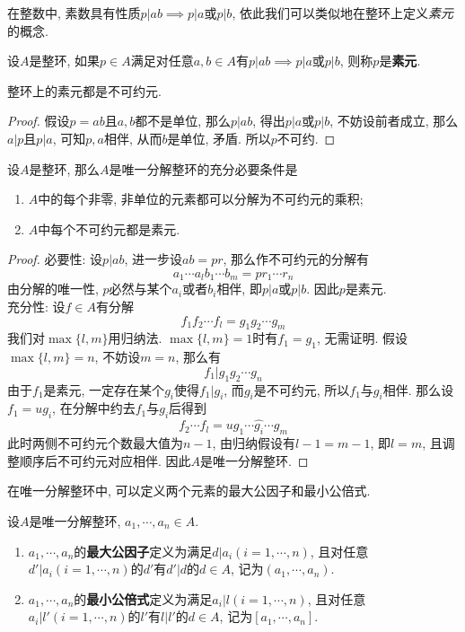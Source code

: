 在整数中, 素数具有性质$p|ab\implies p|a$或$p|b$, 依此我们可以类似地在整环上定义\textit{素元}的概念.

\begin{defn}
    设$A$是整环, 如果$p\in A$满足对任意$a,b\in A$有$p|ab\implies p|a$或$p|b$, 则称$p$是\textbf{素元}.
\end{defn}

\begin{lem}\label{prime implies irreducible}
    整环上的素元都是不可约元.
\end{lem}
\begin{proof}
    假设$p=ab$且$a,b$都不是单位, 那么$p|ab$, 得出$p|a$或$p|b$, 不妨设前者成立, 那么$a|p$且$p|a$, 可知$p,a$相伴, 从而$b$是单位, 矛盾.
    所以$p$不可约.
\end{proof}

\begin{prop}\label{UFD}
    设$A$是整环, 那么$A$是唯一分解整环的充分必要条件是
    \begin{enumerate}[(1)]
        \item $A$中的每个非零, 非单位的元素都可以分解为不可约元的乘积;
        \item $A$中每个不可约元都是素元.
    \end{enumerate}
\end{prop}
\begin{proof}
    必要性: 设$p|ab$, 进一步设$ab=pr$, 那么作不可约元的分解有
    \[a_1\cdots a_lb_1\cdots b_m=pr_1\cdots r_n\]
    由分解的唯一性, $p$必然与某个$a_i$或者$b_i$相伴, 即$p|a$或$p|b$.
    因此$p$是素元.\\
    充分性: 设$f\in A$有分解
    \[f_1f_2\cdots f_l=g_1g_2\cdots g_m\]
    我们对$\max\{l,m\}$用归纳法.
    $\max\{l,m\}=1$时有$f_1=g_1$, 无需证明.
    假设$\max\{l,m\}=n$, 不妨设$m=n$, 那么有
    \[f_1|g_1g_2\cdots g_n\]
    由于$f_1$是素元, 一定存在某个$g_i$使得$f_1|g_i$, 而$g_i$是不可约元, 所以$f_1$与$g_i$相伴.
    那么设$f_1=ug_i$, 在分解中约去$f_1$与$g_i$后得到
    \[f_2\cdots f_l=ug_1\cdots\widehat{g_i}\cdots g_m\]
    此时两侧不可约元个数最大值为$n-1$, 由归纳假设有$l-1=m-1$, 即$l=m$, 且调整顺序后不可约元对应相伴.
    因此$A$是唯一分解整环.
\end{proof}

在唯一分解整环中, 可以定义两个元素的最大公因子和最小公倍式.
\begin{defn}设$A$是唯一分解整环, $a_1,\cdots,a_n\in A$.
    \begin{enumerate}[(1)]
        \item $a_1,\cdots,a_n$的\textbf{最大公因子}定义为满足$d|a_i(i=1,\cdots,n)$, 且对任意$d'|a_i(i=1,\cdots,n)$的$d'$有$d'|d$的$d\in A$, 记为$(a_1,\cdots,a_n)$.
        \item $a_1,\cdots,a_n$的\textbf{最小公倍式}定义为满足$a_i|l(i=1,\cdots,n)$, 且对任意$a_i|l'(i=1,\cdots,n)$的$l'$有$l|l'$的$d\in A$, 记为$[a_1,\cdots,a_n]$.
    \end{enumerate}
\end{defn}

